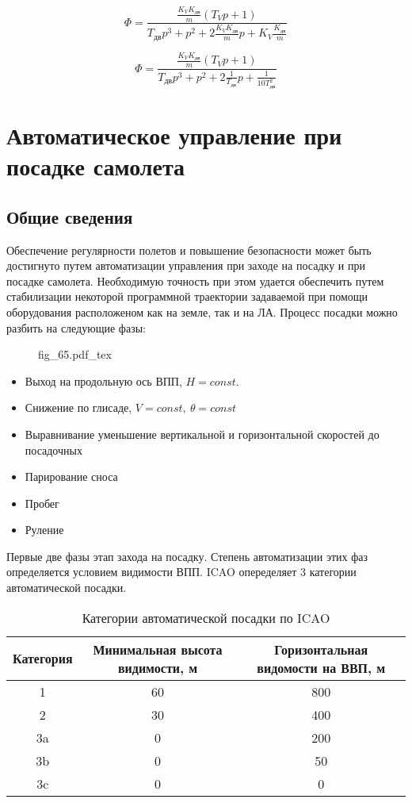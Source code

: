 \documentclass{article}
\newcommand{\incfig}[1]{
    {#1.pdf_tex}
}
\begin{document}
\[
    \Phi = \frac{\frac{K_V K_\text{дв}}{m}(T_V p + 1)}{T_\text{дв} p^3 + p^2 + 2 \frac{K_V K_\text{дв}}{m}p + K_V \frac{K_\text{дв}}{m}}
\]

\[
    \Phi = \frac{\frac{K_V K_\text{дв}}{m}(T_V p + 1)}{ T_\text{дв}p^3 + p^2 + 2 \frac{1}{T_\text{дв}}p + \frac{1}{10 T_\text{дв}^2}}
\]

\section{Автоматическое управление при посадке самолета}
\subsection{Общие сведения}
Обеспечение регулярности полетов и повышение безопасности может быть достигнуто путем автоматизации управления при заходе на посадку и при посадке самолета. Необходимую точность при этом удается обеспечить путем стабилизации некоторой программной траектории задаваемой при помощи оборудования расположеном как на земле, так и на ЛА.
Процесс посадки можно разбить на следующие фазы:
\begin{figure}[H]
    \centering
    \incfig{fig_65}
    \label{fig:fig_65}
\end{figure}
\begin{itemize}
    \item  Выход на продольную ось ВПП, $H=const$.
        \item Снижение по глисаде, $V=const, \ \theta = const$ 
            \item Выравнивание уменьшение вертикальной и горизонтальной скоростей до посадочных
                \item Парирование сноса
                    \item Пробег
                        \item Руление
\end{itemize}
Первые две фазы этап захода на посадку. Степень автоматизации этих фаз определяется условием видимости ВПП. ICAO опеределяет 3 категории автоматической посадки.  
\begin{table}[H]
    \centering
    \caption{Категории автоматической посадки по ICAO}
    \label{tab:label}
    \begin{tabular}{|c|c|c|}
        \toprule
        Категория & Минимальная высота видимости, м & Горизонтальная видомости на ВВП, м \\ 
        \midrule
        1 & 60 & 800  \\
        2 & 30 & 400 \\
        3a & 0 & 200 \\
        3b & 0 & 50 \\
        3c & 0 & 0 \\
        \bottomrule
    \end{tabular}
\end{table}
\end{document}
